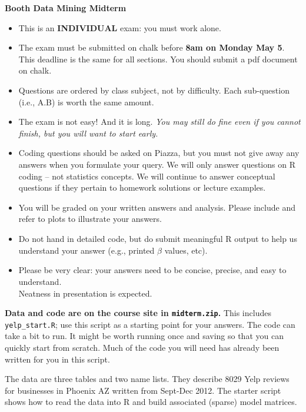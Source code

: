 \documentclass[12pt]{article}
\begin{document}
\pagestyle{empty} 


{\bf   \huge {} Booth Data Mining Midterm }

\bigskip
\begin{itemize}
\item {\color{Maroon} This is an {\bf INDIVIDUAL} exam: you must work alone.}
\item {\color{Maroon} The exam must be submitted on chalk before {\bf 8am on Monday May 5}}. \\ This deadline is the same for all sections.  You should submit a pdf document on chalk.
\item Questions are ordered by class subject, not by difficulty.  Each sub-question (i.e., {A.B}) is worth the same amount.
\item The exam is not easy!   And it is long.  {\it You may still do fine even if you cannot finish, but you will want to start early.} 
\item Coding questions should be asked on Piazza, but you must not give away any answers when you formulate your query. We will only answer questions on R coding -- not statistics concepts.  
We will continue to answer conceptual questions if they pertain to homework solutions or lecture examples.
\item You will be graded on your written answers and analysis.  Please include and refer to plots to illustrate your answers.  
\item Do not hand in detailed code, but do submit meaningful R output to help us understand your answer (e.g., printed $\hat\beta$ values, etc).
\item Please be very clear: your answers need to be concise, precise, and easy to understand. \\ Neatness in presentation is expected.
\end{itemize}

\medskip

\noindent
{\bf Data and code are on the course site in 
	{\tt midterm.zip}.}  
	This includes {\tt yelp\_start.R}; use this script as a starting point for your answers.  The code can take a bit to run.  It might be worth running once and saving so that you can quickly start from scratch.  {\color{Maroon} Much of the code you will need has already been written for you in this script.}


\medskip\noindent
The data are three tables and two name lists.  They describe
8029 Yelp reviews for businesses in Phoenix AZ written from Sept-Dec 2012. The starter script shows how to read the data into R and build associated (sparse) model matrices.
\end{document}
